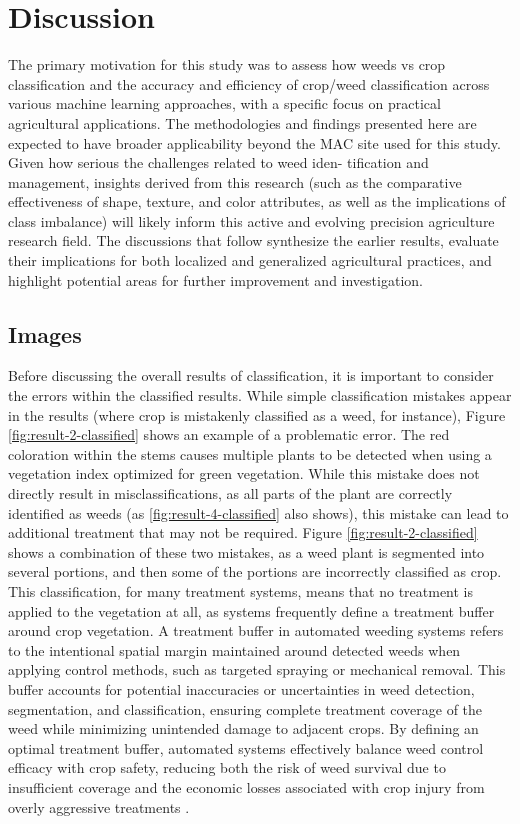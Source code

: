 \documentclass[letterpaper, notitlepage]{report}
\begin{document}
\chapter{Discussion}
\label{section:discussion}
The primary motivation for this study was to assess how weeds vs crop classification and the accuracy and efficiency of crop/weed classification across various machine learning approaches, with a specific focus on practical agricultural applications. The methodologies and findings presented here are expected to have broader applicability beyond the MAC site used for this study. Given how serious the challenges related to weed iden- tification and management, insights derived from this research (such as the comparative effectiveness of shape, texture, and color attributes, as well as the implications of class imbalance) will likely inform this active and evolving precision agriculture research field. The discussions that follow synthesize the earlier results, evaluate their implications for both localized and generalized agricultural practices, and highlight potential areas for further improvement and investigation.

\section{Images}
Before discussing the overall results of classification, it is important to consider the errors within the classified results. While simple classification mistakes appear in the results (where crop is mistakenly classified as a weed, for instance), Figure \ref{fig:result-2-classified} shows an example of a problematic error. The red coloration within the stems causes multiple plants to be detected when using a vegetation index optimized for green vegetation. While this mistake does not directly result in misclassifications, as all parts of the plant are correctly identified as weeds (as \ref{fig:result-4-classified} also shows), this mistake can lead to additional treatment that may not be required. Figure \ref{fig:result-2-classified} shows a combination of these two mistakes, as a weed plant is segmented into several portions, and then some of the portions are incorrectly classified as crop. This classification, for many treatment systems, means that no treatment is applied to the vegetation at all, as systems frequently define a treatment buffer around crop vegetation. A treatment buffer in automated weeding systems refers to the intentional spatial margin maintained around detected weeds when applying control methods, such as targeted spraying or mechanical removal. This buffer accounts for potential inaccuracies or uncertainties in weed detection, segmentation, and classification, ensuring complete treatment coverage of the weed while minimizing unintended damage to adjacent crops. By defining an optimal treatment buffer, automated systems effectively balance weed control efficacy with crop safety, reducing both the risk of weed survival due to insufficient coverage and the economic losses associated with crop injury from overly aggressive treatments \parencite{Scott-Stoddard2023-he, Sapkota2023-kx}.
\end{document}
